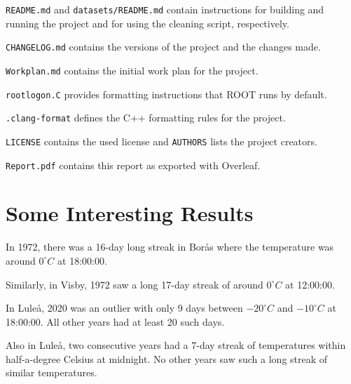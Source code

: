 \documentclass[12pt]{article}
\begin{document}
{\tt README.md} and {\tt datasets/README.md} contain instructions for building and running the project and for using the cleaning script, respectively.

{\tt CHANGELOG.md} contains the versions of the project and the changes made.

{\tt Workplan.md} contains the initial work plan for the project.

{\tt rootlogon.C} provides formatting instructions that ROOT runs by default.

{\tt .clang-format} defines the C++ formatting rules for the project.

{\tt LICENSE} contains the used license and {\tt AUTHORS} lists the project creators.

{\tt Report.pdf} contains this report as exported with Overleaf.

\section{Some Interesting Results}

In 1972, there was a 16-day long streak in Borås where the temperature was around $0^\circ C$ at 18:00:00.

\begin{figure}[H]
    \centering
    \scalebox{.5}{}
    \label{fig:enter-label}
\end{figure}

Similarly, in Visby, 1972 saw a long 17-day streak of around $0^\circ C$ at 12:00:00. 

\begin{figure}[H]
    \centering
    \scalebox{.5}{}
    \label{fig:enter-label}
\end{figure}

In Luleå, 2020 was an outlier with only 9 days between $-20^\circ C$ and $-10^\circ C$ at 18:00:00. All other years had at least 20 such days.

\begin{figure}[H]
    \centering
    \scalebox{.5}{}
    \label{fig:enter-label}
\end{figure}

Also in Luleå, two consecutive years had a 7-day streak of temperatures within half-a-degree Celsius at midnight. No other years saw such a long streak of similar temperatures.

\begin{figure}[H]
    \centering
    \scalebox{.5}{}
    \label{fig:enter-label}
\end{figure}
\end{document}
